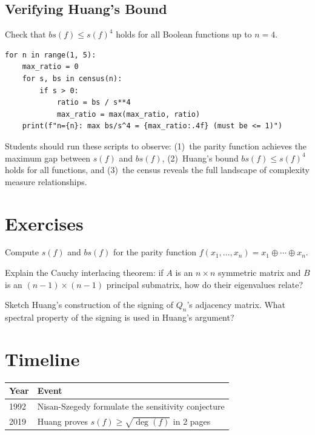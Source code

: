 \subsection{Verifying Huang's Bound}

Check that $bs(f) \leq s(f)^4$ holds for all Boolean functions up to $n=4$.

\begin{verbatim}
for n in range(1, 5):
    max_ratio = 0
    for s, bs in census(n):
        if s > 0:
            ratio = bs / s**4
            max_ratio = max(max_ratio, ratio)
    print(f"n={n}: max bs/s^4 = {max_ratio:.4f} (must be <= 1)")
\end{verbatim}

\begin{highlightbox}
Students should run these scripts to observe: (1)~the parity function achieves the maximum gap between $s(f)$ and $bs(f)$, (2)~Huang's bound $bs(f) \leq s(f)^4$ holds for all functions, and (3)~the census reveals the full landscape of complexity measure relationships.
\end{highlightbox}

\section{Exercises}

\begin{exercise}[Basic]
Compute $s(f)$ and $bs(f)$ for the parity function $f(x_1, \ldots, x_n) = x_1 \oplus \cdots \oplus x_n$.
\end{exercise}

\begin{exercise}[Intermediate]
Explain the Cauchy interlacing theorem: if $A$ is an $n \times n$ symmetric matrix and $B$ is an $(n-1) \times (n-1)$ principal submatrix, how do their eigenvalues relate?
\end{exercise}

\begin{exercise}[Challenge]
Sketch Huang's construction of the signing of $Q_n$'s adjacency matrix. What spectral property of the signing is used in Huang's argument?
\end{exercise}

\section{Timeline}

\begin{tabularx}{\linewidth}{lX}
\toprule
\textbf{Year} & \textbf{Event} \\ \midrule
1992 & Nisan-Szegedy formulate the sensitivity conjecture \\
2019 & Huang proves $s(f) \ge \sqrt{\deg(f)}$ in 2 pages \\
\bottomrule
\end{tabularx}

